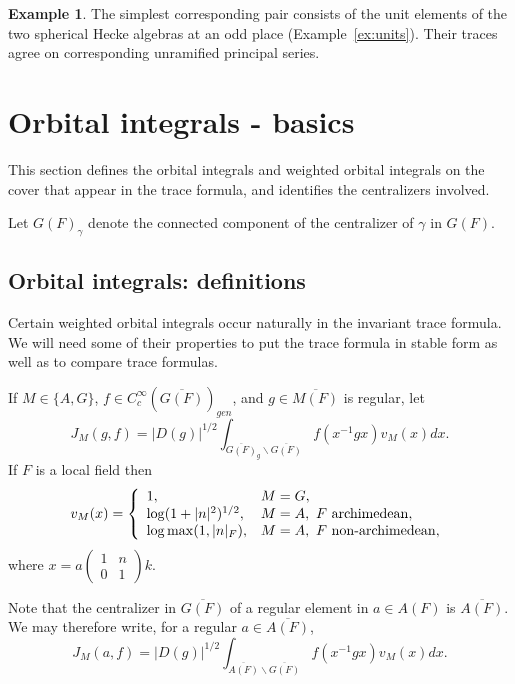 \documentclass[12pt,letterpaper]{book}
\theoremstyle{plain}
\theoremstyle{definition}
\newtheorem{example}[theorem]{Example}
\theoremstyle{remark}
\theoremstyle{remark}
\begin{document}
\begin{example}
The simplest corresponding pair consists of the unit elements of the two
spherical Hecke algebras at an odd place (Example~\ref{ex:units}). Their
traces agree on corresponding unramified principal series.
\end{example}

\section{Orbital integrals - basics}

This section defines the orbital integrals and weighted orbital integrals on the cover that appear in the trace formula, and identifies the centralizers involved.


Let $G(F)_\gamma$ denote the connected component of the centralizer of
$\gamma$ in $G(F)$.

\subsection{Orbital integrals: definitions}\label{sec:weighted-defs}

Certain weighted orbital integrals occur naturally in the invariant trace
formula. We will need some of their properties to put the trace formula in
stable form as well as to compare trace formulas.

If $M\in \{A,G\}$, $f\in C_c^\infty (\overline{G(F)})_{gen}$, and $g\in
\overline{M(F)}$ is regular, let
\[
J_M(g,f)=|D(g)|^{1/2}
\int_{\overline{G(F)}_g\backslash \overline{G(F)}}
f(x^{-1}gx)v_M(x)dx.
\]
If $F$ is a local field then
\[
v_M(x)=\left\{
\begin{array}{ll}
1, & M=G, \\
\log (1+|n|^2)^{1/2}, & M=A,\ F\ {\rm archimedean},\\
\log \max(1,|n|_F), & M=A,\ F\ {\rm non\hbox{-}archimedean},
\end{array}
\right.
\]
where $x=a\left(
\begin{array}{cc}
1 & n \\
0 & 1
\end{array}
\right) k$.

Note that the centralizer in $\overline{G(F)}$ of a regular element
in $a\in A(F)$ is $\overline{A(F)}$. We may therefore write,
for a regular $a\in \overline{A(F)}$,
\begin{equation}
J_M(a,f)=
|D(g)|^{1/2}\int_{\overline{A(F)}\backslash \overline{G(F)}}
f(x^{-1}gx)v_M(x)dx.
\end{equation}
\end{document}
